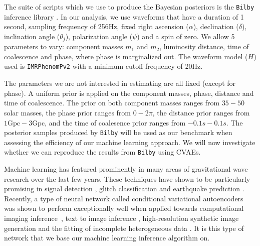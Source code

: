 \documentclass[%
showpacs,
 amsmath,amssymb,
 aps,
 twocolumn,
 prl,
 reprint,
floatfix,
]{revtex4-1}
\begin{document}
%
%
The suite of scripts which we use to produce the Bayesian posteriors is the \texttt{Bilby}
inference library \cite{1811.02042}. In our analysis, we use waveforms 
that have a duration of 1 second, sampling frequency of 256Hz, fixed right ascension ($\alpha$),
declination ($\delta$), inclination angle ($\theta_j$), polarization angle
($\psi$) and a spin of zero. We allow 5 parameters to vary: component masses
$m_1$ and $m_2$, luminosity distance, time of coalescence and phase, where
phase is marginalized out. The waveform model ($H$) used is \texttt{IMRPhenomPv2}
\cite{1809.10113} with a minimum cutoff frequency of 20Hz.

%
%
The parameters we are not interested in estimating are all fixed (except for phase). 
A uniform prior is applied on the component masses, phase, distance and time of 
coalescence. The prior on both component
masses ranges from $35 - 50$ solar masses, the phase prior ranges from $0 -
2\pi$, the distance prior ranges from $1\textrm{Gpc} - 3\textrm{Gpc}$, and the
time of coalesence prior ranges from $-0.1s - 0.1s$. The posterior samples produced 
by \texttt{Bilby} will be used as our benchmark when assessing the efficiency of our
machine learning approach.  We will now investigate whether we can reproduce
the results from \texttt{Bilby} using \ac{CVAE}s. 
   

%
%
Machine learning has featured prominently in many areas of gravitational wave
research over the last few years.  These techniques have shown to be
particularly promising in signal detection
\cite{PhysRevLett.120.141103,GEORGE201864,1904.08693}, glitch classification
\cite{1706.07446,0264-9381-34-6-064003} and earthquake prediction
\cite{Coughlin_2017}. Recently, a type of neural network called
conditional variational autoencoders was shown to perform exceptionally well
when applied towards computational imaging
inference~\cite{1904.06264,NIPS2015_5775}, text to image inference \cite{1512.00570}, 
high-resolution synthetic image generation \cite{1612.00005} and the fitting 
of incomplete heterogeneous data \cite{1807.03653}. It is this type of
network that we base our machine learning inference algorithm on.
\end{document}
